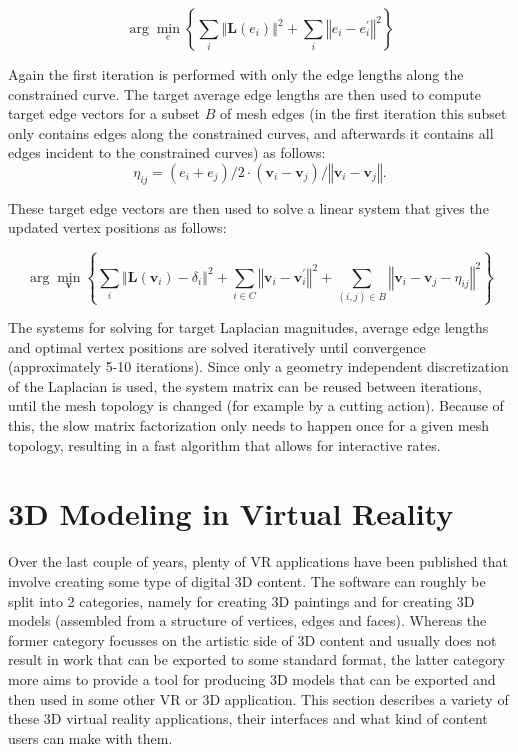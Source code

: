 \begin{equation}
\arg\min_{e} \left\lbrace \sum_{i} \left\Vert \mathbf{L}\left(e_{i}\right) \right\Vert^{2} + \sum_{i} \left\Vert e_{i} - e_{i}^{'} \right\Vert^{2} \right\rbrace
\end{equation}

Again the first iteration is performed with only the edge lengths along the constrained curve. 
The target average edge lengths are then used to compute target edge vectors for a subset $B$ of mesh edges (in the first iteration this subset only contains edges along the constrained curves, and afterwards it contains all edges incident to the constrained curves) as follows:
\begin{equation}
\eta_{ij} = \left( e_{i} + e_{j} \right) / 2 \cdot \left( \mathbf{v}_{i} - \mathbf{v}_{j} \right) / \left\Vert \mathbf{v}_{i} - \mathbf{v}_{j} \right\Vert.
\end{equation}

These target edge vectors are then used to solve a linear system that gives the updated vertex positions as follows: 

\begin{equation}
\arg\min_{\mathbf{v}} \left\lbrace \sum_{i} \left\Vert \mathbf{L}\left(\mathbf{v}_{i}\right) - \delta_{i} \right\Vert^{2} + \sum_{i \in C} \left\Vert \mathbf{v}_{i} - \mathbf{v}_{i}^{'} \right\Vert^{2} + \sum_{\left(i,j\right) \in B} \left \Vert \mathbf{v}_{i} - \mathbf{v}_{j} - \eta_{ij} \right\Vert^{2} \right\rbrace
\end{equation}

The systems for solving for target Laplacian magnitudes, average edge lengths and optimal vertex positions are solved iteratively until convergence (approximately 5-10 iterations). Since only a geometry independent discretization of the Laplacian is used, the system matrix can be reused between iterations, until the mesh topology is changed (for example by a cutting action). Because of this, the slow matrix factorization only needs to happen once for a given mesh topology, resulting in a fast algorithm that allows for interactive rates.	

\section{3D Modeling in Virtual Reality}
\label{sec:3dmodeling}
Over the last couple of years, plenty of VR applications have been published that involve creating some type of digital 3D content. The software can roughly be split into 2 categories, namely for creating 3D paintings and for creating 3D models (assembled from a structure of vertices, edges and faces). Whereas the former category focusses on the artistic side of 3D content and usually does not result in work that can be exported to some standard format, the latter category more aims to provide a tool for producing 3D models that can be exported and then used in some other VR or 3D application. 
This section describes a variety of these 3D virtual reality applications, their interfaces and what kind of content users can make with them. 

